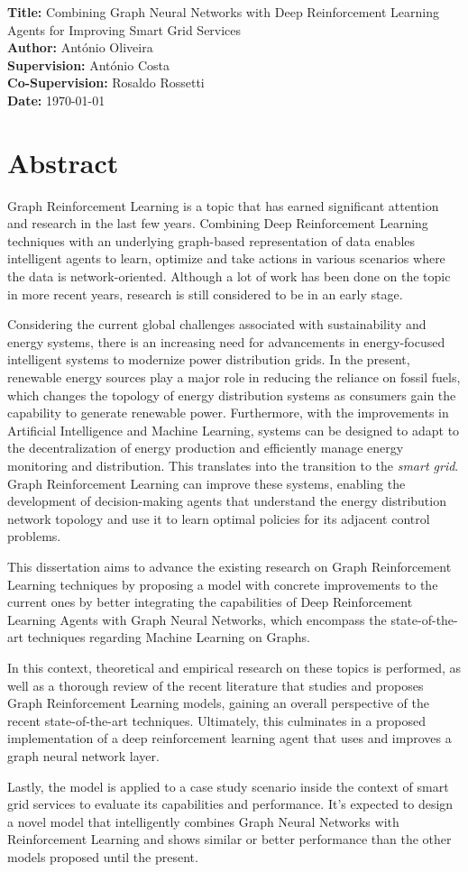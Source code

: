 \documentclass[11pt,a4paper]{article}
\newcommand{\titles}[2]{\noindent\textbf{#1:} #2\\[2mm]}
\begin{document}
\titles{Title}{Combining Graph Neural Networks with Deep Reinforcement Learning Agents for Improving Smart Grid Services}
\titles{Author}{António Oliveira}
\titles{Supervision}{António Costa}
\titles{Co-Supervision}{Rosaldo Rossetti}
\titles{Date}{\today}

\section*{Abstract}

Graph Reinforcement Learning is a topic that has earned significant attention and research in the last few years. Combining Deep Reinforcement Learning techniques with an underlying graph-based representation of data enables intelligent agents to learn, optimize and take actions in various scenarios where the data is network-oriented. Although a lot of work has been done on the topic in more recent years, research is still considered to be in an early stage. \par
Considering the current global challenges associated with sustainability and energy systems, there is an increasing need for advancements in energy-focused intelligent systems to modernize power distribution grids. In the present, renewable energy sources play a major role in reducing the reliance on fossil fuels, which changes the topology of energy distribution systems as consumers gain the capability to generate renewable power. Furthermore, with the improvements in Artificial Intelligence and Machine Learning, systems can be designed to adapt to the decentralization of energy production and efficiently manage energy monitoring and distribution. This translates into the transition to the \textit{smart grid}. Graph Reinforcement Learning can improve these systems, enabling the development of decision-making agents that understand the energy distribution network topology and use it to learn optimal policies for its adjacent control problems. \par
This dissertation aims to advance the existing research on Graph Reinforcement Learning techniques by proposing a model with concrete improvements to the current ones by better integrating the capabilities of Deep Reinforcement Learning Agents with Graph Neural Networks, which encompass the state-of-the-art techniques regarding Machine Learning on Graphs. \par
In this context, theoretical and empirical research on these topics is performed, as well as a thorough review of the recent literature that studies and proposes Graph Reinforcement Learning models,  gaining an overall perspective of the recent state-of-the-art techniques. Ultimately, this culminates in a proposed implementation of a deep reinforcement learning agent that uses and improves a graph neural network layer. \par
Lastly, the model is applied to a case study scenario inside the context of smart grid services to evaluate its capabilities and performance. It's expected to design a novel model that intelligently combines Graph Neural Networks with Reinforcement Learning and shows similar or better performance than the other models proposed until the present.
\end{document}
